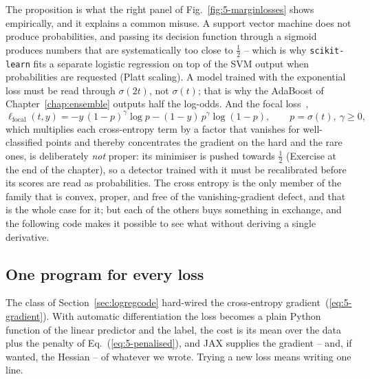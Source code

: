 The proposition is what the right panel of Fig.~\ref{fig:5-marginlosses}
shows empirically, and it explains a common misuse.  A support vector machine
does not produce probabilities, and passing its decision function through a
sigmoid produces numbers that are systematically too close to $\tfrac12$ --
which is why \texttt{scikit-learn} fits a separate logistic regression on top
of the SVM output when probabilities are requested (Platt scaling).  A model
trained with the exponential loss must be read through $\sigma(2t)$, not
$\sigma(t)$; that is why the AdaBoost of Chapter~\ref{chap:ensemble} outputs
half the log-odds.  And the focal loss~\cite{lin2017},
\begin{equation}
  \ell_{\mathrm{focal}}(t,y)
   = -y\,(1-p)^{\gamma}\log p - (1-y)\,p^{\gamma}\log(1-p),
  \qquad p=\sigma(t),\ \gamma\ge0,
  \label{eq:5-focal}
\end{equation}
which multiplies each cross-entropy term by a factor that vanishes for
well-classified points and thereby concentrates the gradient on the hard and
the rare ones, is deliberately \emph{not} proper: its minimiser is pushed
towards $\tfrac12$ (Exercise at the end of the chapter), so a detector trained
with it must be recalibrated before its scores are read as probabilities.
The cross entropy is the only member of the family that is convex, proper,
and free of the vanishing-gradient defect, and that is the whole case for it;
but each of the others buys something in exchange, and the following code
makes it possible to see what without deriving a single derivative.

\subsection{One program for every loss}
\label{sec:losscode}

The class of Section~\ref{sec:logregcode} hard-wired the cross-entropy
gradient~(\ref{eq:5-gradient}).  With automatic differentiation the loss
becomes a plain Python function of the linear predictor and the label, the
cost is its mean over the data plus the penalty of Eq.~(\ref{eq:5-penalised}),
and JAX supplies the gradient -- and, if wanted, the Hessian -- of whatever
we wrote.  Trying a new loss means writing one line.

